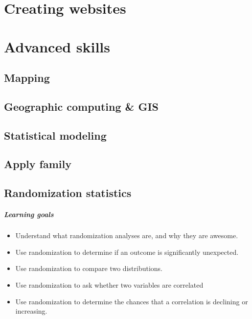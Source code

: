 \documentclass[
]{book}
\providecommand{\tightlist}{%
  \setlength{\itemsep}{0pt}\setlength{\parskip}{0pt}}
\begin{document}
\hypertarget{part-creating-websites}{%
\part{Creating websites}\label{part-creating-websites}}

\hypertarget{part-advanced-skills}{%
\part{Advanced skills}\label{part-advanced-skills}}

\hypertarget{mapping}{%
\chapter{Mapping}\label{mapping}}

\hypertarget{geographic-computing-gis}{%
\chapter{Geographic computing \& GIS}\label{geographic-computing-gis}}

\hypertarget{statistical-modeling}{%
\chapter{Statistical modeling}\label{statistical-modeling}}

\hypertarget{apply-family}{%
\chapter{Apply family}\label{apply-family}}

\hypertarget{randomization-statistics}{%
\chapter{Randomization statistics}\label{randomization-statistics}}

\hypertarget{learning-goals-20}{%
\subsubsection*{Learning goals}\label{learning-goals-20}}

\begin{itemize}
\tightlist
\item
  Understand what randomization analyses are, and why they are awesome.
\item
  Use randomization to determine if an outcome is significantly unexpected.
\item
  Use randomization to compare two distributions.
\item
  Use randomization to ask whether two variables are correlated
\item
  Use randomization to determine the chances that a correlation is declining or increasing.
\end{itemize}
\end{document}
